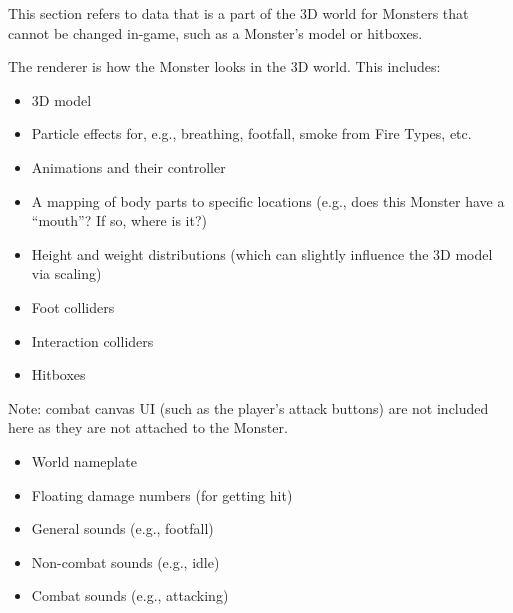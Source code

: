 
This section refers to data that is a part of the 3D world for Monsters that cannot be changed in-game, such as a Monster's model or hitboxes.

The renderer is how the Monster looks in the 3D world. This includes:
\begin{itemize}
	\item{3D model}
	\item{Particle effects for, e.g., breathing, footfall, smoke from Fire Types, etc.}
	\item{Animations and their controller}
	\item{A mapping of body parts to specific locations (e.g., does this Monster have a ``mouth''? If so, where is it?)}
	\item{Height and weight distributions (which can slightly influence the 3D model via scaling)}
\end{itemize}

\begin{itemize}
	\item{Foot colliders}
	\item{Interaction colliders}
	\item{Hitboxes}
\end{itemize}

Note: combat canvas UI (such as the player's attack buttons) are not included here as they are not attached to the Monster.
\begin{itemize}
	\item{World nameplate}
	\item{Floating damage numbers (for getting hit)}
\end{itemize}

\begin{itemize}
	\item{General sounds (e.g., footfall)}
	\item{Non-combat sounds (e.g., idle)}
	\item{Combat sounds (e.g., attacking)}
\end{itemize}